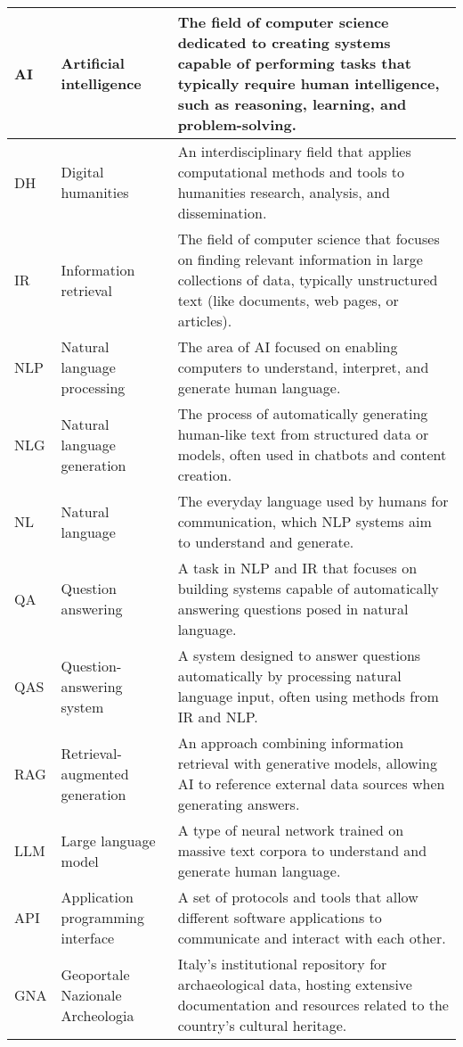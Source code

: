 \begin{tabularx}{\textwidth}{
  >{\raggedright\arraybackslash}p{2.5cm}
  >{\raggedright\arraybackslash}p{4cm}
  >{\noindent\justifying\arraybackslash}X
}
AI    & Artificial intelligence & The field of computer science dedicated to creating systems capable of performing tasks that typically require human intelligence, such as reasoning, learning, and problem-solving. \\
\cmidrule(lr){1-3}
DH    & Digital humanities & An interdisciplinary field that applies computational methods and tools to humanities research, analysis, and dissemination. \\
\cmidrule(lr){1-3}
IR    & Information retrieval & The field of computer science that focuses on finding relevant information in large collections of data, typically unstructured text (like documents, web pages, or articles). \\
\cmidrule(lr){1-3}
NLP   & Natural language processing & The area of AI focused on enabling computers to understand, interpret, and generate human language. \\
\cmidrule(lr){1-3}
NLG   & Natural language generation & The process of automatically generating human-like text from structured data or models, often used in chatbots and content creation. \\
\cmidrule(lr){1-3}
NL & Natural language & The everyday language used by humans for communication, which NLP systems aim to understand and generate. \\
\cmidrule(lr){1-3}
QA    & Question answering & A task in NLP and IR that focuses on building systems capable of automatically answering questions posed in natural language. \\
\cmidrule(lr){1-3}
QAS   & Question-answering system & A system designed to answer questions automatically by processing natural language input, often using methods from IR and NLP. \\
\cmidrule(lr){1-3}
RAG   & Retrieval-augmented generation & An approach combining information retrieval with generative models, allowing AI to reference external data sources when generating answers. \\
\cmidrule(lr){1-3}
LLM   & Large language model & A type of neural network trained on massive text corpora to understand and generate human language. \\
\cmidrule(lr){1-3}
API  & Application programming interface & A set of protocols and tools that allow different software applications to communicate and interact with each other. \\
\cmidrule(lr){1-3}
GNA   & Geoportale Nazionale Archeologia & Italy's institutional repository for archaeological data, hosting extensive documentation and resources related to the country's cultural heritage. \\

\end{tabularx}
